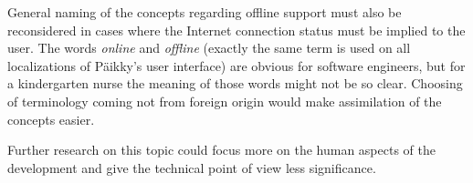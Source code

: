 General naming of the concepts regarding offline support must also be reconsidered in cases where the Internet connection status must be implied to the user. The words \textit{online} and \textit{offline} (exactly the same term is used on all localizations of Päikky's user interface) are obvious for software engineers, but for a kindergarten nurse the meaning of those words might not be so clear. Choosing of terminology coming not from foreign origin would make assimilation of the concepts easier.

Further research on this topic could focus more on the human aspects of the development and give the technical point of view less significance.
















